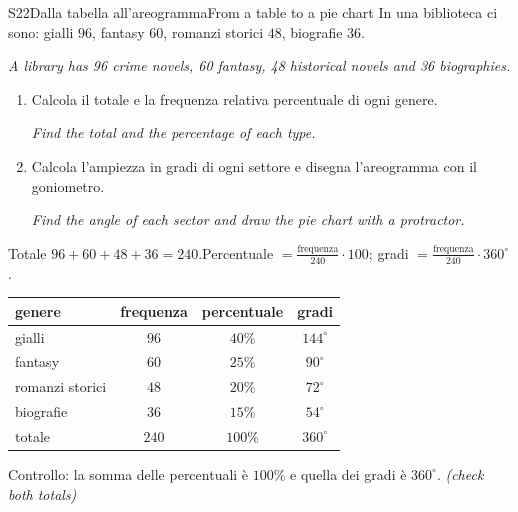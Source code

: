 \documentclass[11pt,a4paper]{article}
\newcommand{\en}[1]{\par{\small\itshape\color{engray}#1\par}}
\newcommand{\enx}[1]{{\small\itshape\color{engray}(#1)}}
\begin{document}
\begin{esercizio}{S2}{2}{Dalla tabella all'areogramma}{From a table to a pie chart}
In una biblioteca ci sono: gialli $96$, fantasy $60$, romanzi storici $48$, biografie $36$.
\en{A library has 96 crime novels, 60 fantasy, 48 historical novels and 36 biographies.}
\begin{enumerate}
\item Calcola il totale e la frequenza relativa percentuale di ogni genere.
\en{Find the total and the percentage of each type.}
\item Calcola l'ampiezza in gradi di ogni settore e disegna l'areogramma con il goniometro.
\en{Find the angle of each sector and draw the pie chart with a protractor.}
\end{enumerate}
\end{esercizio}
\begin{solbox}
Totale $96+60+48+36=240$.\quad Percentuale $=\frac{\text{frequenza}}{240}\cdot100$; \quad gradi $=\frac{\text{frequenza}}{240}\cdot360^\circ$.
\begin{center}
\begin{tabular}{@{}lccc@{}}
\toprule
genere & frequenza & percentuale & gradi\\
\midrule
gialli & $96$ & $40\%$ & $144^\circ$\\
fantasy & $60$ & $25\%$ & $90^\circ$\\
romanzi storici & $48$ & $20\%$ & $72^\circ$\\
biografie & $36$ & $15\%$ & $54^\circ$\\
\midrule
totale & $240$ & $100\%$ & $360^\circ$\\
\bottomrule
\end{tabular}
\hspace{1cm}
\end{center}
Controllo: la somma delle percentuali è $100\%$ e quella dei gradi è $360^\circ$. \enx{check both totals}
\end{solbox}
\end{document}
